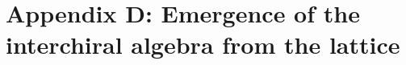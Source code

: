 \documentclass[11pt]{article}
\renewcommand{\theequation}{\thesection.\arabic{equation}}
\newcommand{\surj}{\twoheadrightarrow}
\newcommand{\proj}{P}
\newcommand{\q}{\mathfrak{q}}
\newcommand{\JTL}[1]{JTL_{#1}}
\newcommand{\LQGodd}{U^{\text{odd}}_{\q} s\ell(2)}
\newcommand{\f}{\mathsf{f}}
\newcommand{\e}{\mathsf{e}}
\newcommand{\Hilb}{\mathcal{H}}
\newcommand{\Endo}{\mathrm{End}}
\newcommand{\interLie}{\mathfrak{S}}
\newcommand{\interfin}[1]{\interLie_{#1}}
\newcommand{\interinfin}{\interLie_{\infty}}
\newcommand{\cent}{\mathfrak{Z}}
\theoremstyle{definition}
\begin{document}
%

\section*{Appendix D: Emergence of the interchiral algebra from the lattice}\label{sec:emerge-latVir}
\renewcommand\thesection{D}
\renewcommand{\theequation}{D\arabic{equation}}
\setcounter{equation}{0}
\end{document}
